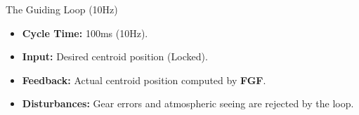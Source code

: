 \begin{frame}{The Guiding Loop (10Hz)}
    
    \vspace{0.5cm}
    \begin{itemize}
        \item \textbf{Cycle Time:} 100ms (10Hz).
        \item \textbf{Input:} Desired centroid position (Locked).
        \item \textbf{Feedback:} Actual centroid position computed by \textbf{FGF}.
        \item \textbf{Disturbances:} Gear errors and atmospheric seeing are rejected by the loop.
    \end{itemize}
\end{frame}

